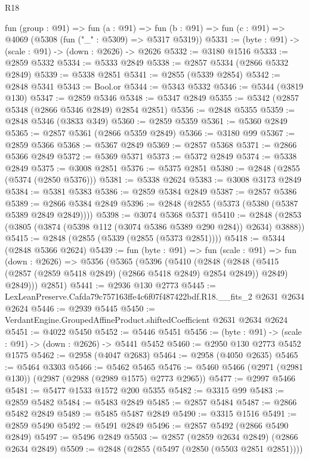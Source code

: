 \begin{lexlean}{R18}
\begin{coremodule}
  fun (group : @91) =>
  fun (a : @91) =>
  fun (b : @91) => fun (c : @91) => @4069 (@5308 (fun ("_" : @5309) => @5317 @5319))
@5331 := (byte : @91) -> (scale : @91) -> (down : @2626) -> @2626
@5332 := @3180 @1516
@5333 := @2859 @5332
@5334 := @5333 @2849
@5338 := @2857 @5334 (@2866 @5332 @2849)
@5339 := @5338 @2851
@5341 := @2855 (@5339 @2854)
@5342 := @2848 @5341
@5343 := Bool.or
@5344 := @5343 @5332
@5346 := @5344 (@3819 @130)
@5347 := @2859 @5346
@5348 := @5347 @2849
@5355 := @5342 (@2857 @5348 (@2866 @5346 @2849) @2854 @2851)
@5356 := @2848 @5355
@5359 := @2848 @5346 (@3833 @349)
@5360 := @2859 @5359
@5361 := @5360 @2849
@5365 := @2857 @5361 (@2866 @5359 @2849)
@5366 := @3180 @99
@5367 := @2859 @5366
@5368 := @5367 @2849
@5369 := @2857 @5368
@5371 := @2866 @5366 @2849
@5372 := @5369 @5371
@5373 := @5372 @2849
@5374 := @5338 @2849
@5375 := @3008 @2851
@5376 := @5375 @2851
@5380 := @2848 (@2855 (@5374 (@2850 @5376)))
@5381 := @5338 @2624
@5383 := @3008 @3173 @2849
@5384 := @5381 @5383
@5386 := @2859 @5384 @2849
@5387 := @2857 @5386
@5389 := @2866 @5384 @2849
@5396 := @2848 (@2855 (@5373 (@5380 (@5387 @5389 @2849 @2849))))
@5398 := @3074 @5368 @5371
@5410 := @2848 (@2853 (@3805 (@3874 (@5398 @112 (@3074 @5386 @5389 @290 @284)) @2634) @3888))
@5415 := @2848 (@2855 (@5339 (@2855 (@5373 @2851))))
@5418 := @5344 (@2848 @5366 @2624)
@5439 := fun (byte : @91) =>
  fun (scale : @91) =>
  fun (down : @2626) =>
  @5356
    (@5365
      (@5396
        (@5410
          (@2848
            (@2848 (@5415 (@2857 (@2859 @5418 @2849) (@2866 @5418 @2849) @2854 @2849)) @2849)
            @2849)))
      @2851)
@5441 := @2936 @130 @2773
@5445 := LexLeanPreserve.Cafda79c757163ffe4c6f07f487422bdf.R18.__fits_2 @2631 @2634 @2624
@5446 := @2939 @5445
@5450 := VerdantEngine.GroupedAffineProduct.shiftedCoefficient @2631 @2634 @2624
@5451 := @4022 @5450
@5452 := @5446 @5451
@5456 := (byte : @91) -> (scale : @91) -> (down : @2626) -> @5441 @5452
@5460 := @2950 @130 @2773 @5452 @1575
@5462 := @2958 (@4047 @2683)
@5464 := @2958 (@4050 @2635)
@5465 := @5464 @3303
@5466 := @5462 @5465
@5476 := @5460 @5466 (@2971 (@2981 @130)) (@2987 (@2988 (@2989 @1575) @2773 @2965))
@5477 := @2997 @5466
@5481 := @5477 @1533 @1572 @200 @5355
@5482 := @3315 @99
@5483 := @2859 @5482
@5484 := @5483 @2849
@5485 := @2857 @5484
@5487 := @2866 @5482 @2849
@5489 := @5485 @5487 @2849
@5490 := @3315 @1516
@5491 := @2859 @5490
@5492 := @5491 @2849
@5496 := @2857 @5492 (@2866 @5490 @2849)
@5497 := @5496 @2849
@5503 := @2857 (@2859 @2634 @2849) (@2866 @2634 @2849)
@5509 := @2848 (@2855 (@5497 (@2850 (@5503 @2851 @2851))))

\end{coremodule}
\end{lexlean}
